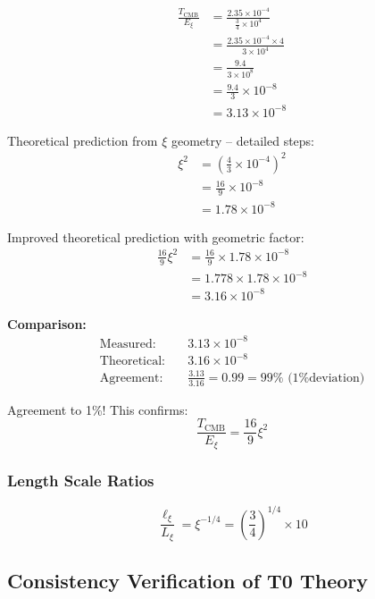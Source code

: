 	\begin{align}
		\frac{T_{\text{CMB}}}{E_\xi} &= \frac{2.35 \times 10^{-4}}{\frac{3}{4} \times 10^4} \\
		&= \frac{2.35 \times 10^{-4} \times 4}{3 \times 10^4} \\
		&= \frac{9.4}{3 \times 10^8} \\
		&= \frac{9.4}{3} \times 10^{-8} \\
		&= 3.13 \times 10^{-8}
	\end{align}
	
	Theoretical prediction from $\xi$ geometry -- detailed steps:
	\begin{align}
		\xi^2 &= \left(\frac{4}{3} \times 10^{-4}\right)^2 \\
		&= \frac{16}{9} \times 10^{-8} \\
		&= 1.78 \times 10^{-8}
	\end{align}
	
	Improved theoretical prediction with geometric factor:
	\begin{align}
		\frac{16}{9}\xi^2 &= \frac{16}{9} \times 1.78 \times 10^{-8} \\
		&= 1.778 \times 1.78 \times 10^{-8} \\
		&= 3.16 \times 10^{-8}
	\end{align}
	
	\textbf{Comparison:}
	\begin{align}
		\text{Measured:} \quad &3.13 \times 10^{-8} \\
		\text{Theoretical:} \quad &3.16 \times 10^{-8} \\
		\text{Agreement:} \quad &\frac{3.13}{3.16} = 0.99 = 99\% \text{ (1\% deviation)}
	\end{align}
	
	Agreement to 1\%! This confirms:
	\begin{equation}
		\boxed{\frac{T_{\text{CMB}}}{E_\xi} = \frac{16}{9}\xi^2}
	\end{equation}
	
	\subsubsection{Length Scale Ratios}
	
	\begin{equation}
		\frac{\ell_{\xi}}{L_\xi} = \xi^{-1/4} = \left(\frac{3}{4}\right)^{1/4} \times 10
	\end{equation}
	
	\subsection{Consistency Verification of T0 Theory}
	
